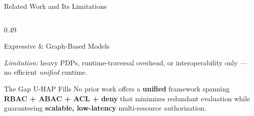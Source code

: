\documentclass[aspectratio=169,10pt]{beamer}
\begin{document}
\begin{frame}[t]{Related Work and Its Limitations}
\begin{columns}[T,onlytextwidth]
\begin{column}{0.49\textwidth}
\begin{callout}[fonttitle=\bfseries\scriptsize,fontupper=\tiny]{Expressive \& Graph-Based Models}
\begin{itemize}
\end{itemize}
\emph{Limitation:} heavy PDPs, runtime-traversal overhead, or interoperability only --- no efficient \emph{unified} runtime.
\end{callout}
\vspace{2pt}
\begin{callout}[fonttitle=\bfseries\scriptsize,fontupper=\scriptsize]{The Gap U-HAP Fills}
No prior work offers a \textbf{unified} framework spanning \textbf{RBAC + ABAC + ACL + deny} that minimizes redundant evaluation while guaranteeing \textbf{scalable, low-latency} multi-resource authorization.
\end{callout}
\end{column}
\end{columns}
\end{frame}
\end{document}
